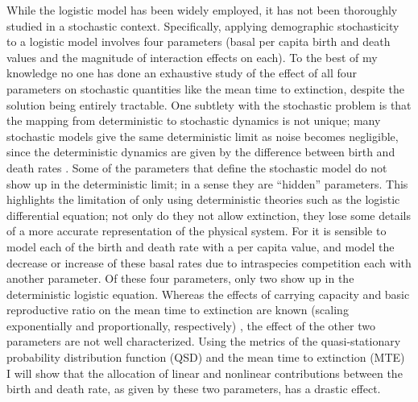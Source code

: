 While the logistic model has been widely employed, it has not been thoroughly studied in a stochastic context. 
Specifically, applying demographic stochasticity to a logistic model involves four parameters (basal per capita birth and death values and the magnitude of interaction effects on each). 
To the best of my knowledge no one has done an exhaustive study of the effect of all four parameters on stochastic quantities like the mean time to extinction, despite the solution being entirely tractable. 
%
One subtlety with the stochastic problem is that the mapping from deterministic to stochastic dynamics is not unique; many stochastic models give the same deterministic limit as noise becomes negligible, since the deterministic dynamics are given by the difference between birth and death rates \cite{Nisbet1982,Norden1982,Nasell2001,Rouzine2001,Gardiner2004}. 
Some of the parameters that define the stochastic model do not show up in the deterministic limit; in a sense they are ``hidden'' parameters. 
This highlights the limitation of only using deterministic theories such as the logistic differential equation; not only do they not allow extinction, they lose some details of a more accurate representation of the physical system. 
For it is sensible to model each of the birth and death rate with a per capita value, and model the decrease or increase of these basal rates due to intraspecies competition each with another parameter. 
Of these four parameters, only two show up in the deterministic logistic equation. 
Whereas the effects of carrying capacity and basic reproductive ratio on the mean time to extinction are known (scaling exponentially and proportionally, respectively) \cite{Leigh1981,Lande1993,Foley1994}, the effect of the other two parameters are not well characterized. 
Using the metrics of the quasi-stationary probability distribution function (QSD) and the mean time to extinction (MTE) I will show that the allocation of linear and nonlinear contributions between the birth and death rate, as given by these two parameters, has a drastic effect. %
